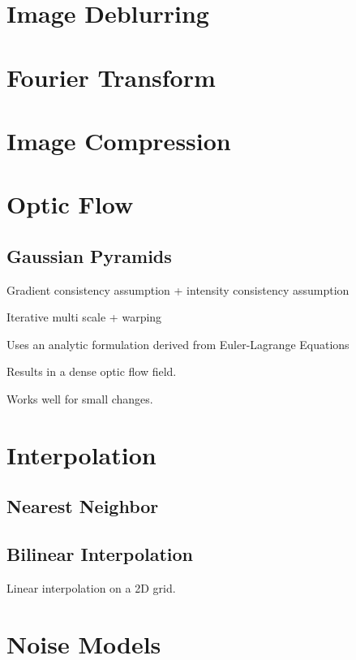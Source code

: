 \section{Image Deblurring}



\section{Fourier Transform}

\section{Image Compression}

\section{Optic Flow}


\subsection{Gaussian Pyramids}

Gradient consistency assumption + intensity consistency assumption

Iterative multi scale + warping

Uses an analytic formulation derived from Euler-Lagrange Equations

Results in a dense optic flow field.

Works well for small changes.

\section{Interpolation}

\subsection{Nearest Neighbor}

\subsection{Bilinear Interpolation}

Linear interpolation on a 2D grid. 


\section{Noise Models}

